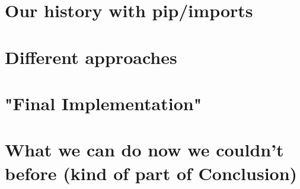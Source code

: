 \section{Our history with pip/imports}
\section{Different approaches}
\section{"Final Implementation"}
\section{What we can do now we couldn't before (kind of part of Conclusion)}